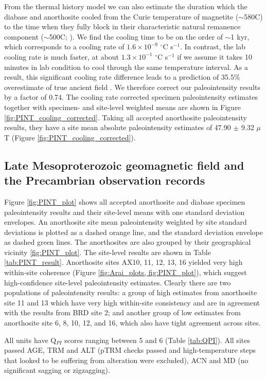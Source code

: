 \documentclass[draft]{agujournal2019}
\begin{document}
From the thermal history model we can also estimate the duration which the diabase and anorthosite cooled from the Curie temperature of magnetite ($\sim$580\textdegree C) to the time when they fully block in their characteristic natural remanence component ($\sim$500\textdegree C; ). We find the cooling time to be on the order of $\sim$1 kyr, which corresponds to a cooling rate of $1.6\times10^{-9}$ $^\circ$C s$^{-1}$. In contrast, the lab cooling rate is much faster, at about $1.3\times10^{-1}$ $^\circ$C s$^{-1}$ if we assume it takes 10 minutes in lab condition to cool through the same temperature interval. As a result, this significant cooling rate difference leads to a prediction of 35.5\% overestimate of true ancient field \cite{Halgedahl1980a}. We therefore correct our paleointensity results by a factor of 0.74. The cooling rate corrected specimen paleointensity estimates together with specimen- and site-level weighted means are shown in Figure \ref{fig:PINT_cooling_corrected}. Taking all accepted anorthosite paleointensity results, they have a site mean absolute paleointensity estimates of 47.90 $\pm$ 9.32 $\mu$T (Figure \ref{fig:PINT_cooling_corrected}). 

\subsection*{Late Mesoproterozoic geomagnetic field and the Precambrian observation records}
Figure \ref{fig:PINT_plot} shows all accepted anorthosite and diabase specimen paleointensity results and their site-level means with one standard deviation envelopes. An anorthosite site mean paleointensity weighted by site standard deviations is plotted as a dashed orange line, and the standard deviation envelope as dashed green lines. The anorthosites are also grouped by their geographical vicinity \ref{fig:PINT_plot}. The site-level results are shown in Table \ref{tab:PINT_result}. Anorthosite sites AX10, 11, 12, 13, 16 yielded very high within-site coherence (Figure \ref{fig:Arai_plots, fig:PINT_plot}), which suggest high-confidence site-level paleointensity estimates. Clearly there are two populations of paleointensity results: a group of high estimates from anorthosite site 11 and 13 which have very high within-site consistency and are in agreement with the results from BRD site 2; and another group of low estimates from anorthosite site 6, 8, 10, 12, and 16, which also have tight agreement across sites.

All units have Q$_{PI}$ scores \cite{Biggin2014a} ranging between 5 and 6 (Table \ref{tab:QPI}). All sites passed AGE, TRM and ALT (pTRM checks passed and high-temperature steps that looked to be suffering from alteration were excluded), ACN and MD (no significant sagging or zigzagging).
\end{document}
